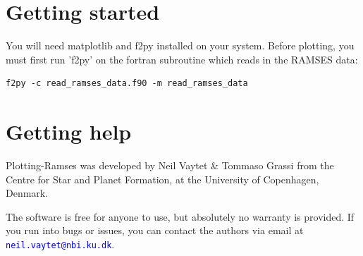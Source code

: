 \documentclass[12pt]{article}
\begin{document}
\section{Getting started}

You will need matplotlib and f2py installed on your system.
Before plotting, you must first run 'f2py' on the fortran subroutine which reads in the RAMSES data:

\begin{lstlisting}
f2py -c read_ramses_data.f90 -m read_ramses_data
\end{lstlisting}


\section{Getting help}

Plotting-Ramses was developed by Neil Vaytet \& Tommaso Grassi from the Centre for Star and Planet Formation, at the University of Copenhagen, Denmark.

\noindent The software is free for anyone to use, but absolutely no warranty is provided. If you run into bugs or issues, you can contact the authors via email at \textcolor{blue}{\texttt{neil.vaytet@nbi.ku.dk}}.
\end{document}
